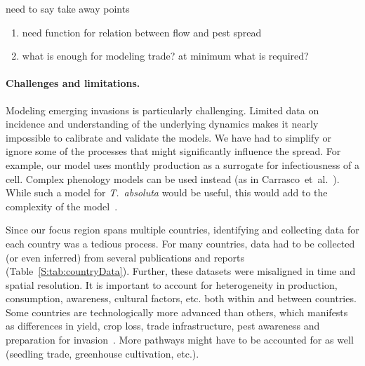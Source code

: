 \documentclass[11pt]{article}
\newcommand{\tuta}{\emph{T.~absoluta}}
\theoremstyle{definition}
\begin{document}
need to say take away points
\begin{enumerate}
    \item need function for relation between flow and pest spread
    \item what is enough for modeling trade? at minimum what is
    required?
\end{enumerate}

\paragraph{Challenges and limitations.} Modeling emerging invasions is
particularly challenging. Limited data on incidence and understanding of
the underlying dynamics makes it nearly impossible to calibrate and
validate the models.   We have had to simplify or ignore some of the
processes that might significantly influence the spread.  For example, our
model uses monthly production as a surrogate for infectiousness of a cell.
Complex phenology models can be used instead (as in
Carrasco~et~al.~\cite{carrasco2010unveiling}). While such a model for
\tuta{} would be useful, this would add to the complexity of the
model~\cite{robinet2012suite}.

Since our focus region spans multiple countries, identifying and collecting
data for each country was a tedious process. For many countries, data had
to be collected (or even inferred) from several publications and reports
(Table~\ref{S:tab:countryData}). Further, these datasets were misaligned in
time and spatial resolution.  It is important to account for heterogeneity
in production, consumption, awareness, cultural factors, etc. both within
and between countries.  Some countries are technologically more advanced
than others, which manifests as differences in yield, crop loss, trade
infrastructure, pest awareness and preparation for
invasion~\cite{early2016global}. More pathways might have to be accounted
for as well (seedling trade, greenhouse cultivation, etc.).

\end{document}
